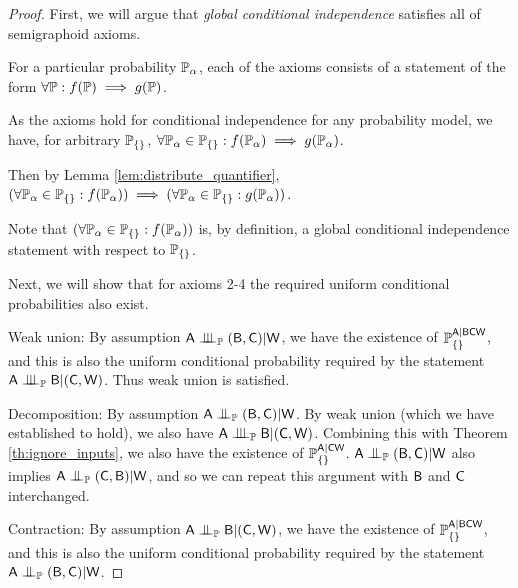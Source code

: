 \begin{proof}
First, we will argue that \emph{global conditional independence} satisfies all of semigraphoid axioms.

For a particular probability $\mathbb{P}_\alpha$, each of the axioms consists of a statement of the form $\forall \mathbb{P}: f(\mathbb{P})\implies g(\mathbb{P})$.

As the axioms hold for conditional independence for any probability model, we have, for arbitrary $\mathbb{P}_{\{\}}$, $\forall \mathbb{P}_\alpha\in \mathbb{P}_{\{\}}: f(\mathbb{P}_{\alpha}) \implies g(\mathbb{P}_\alpha)$. 

Then by Lemma \ref{lem:distribute_quantifier}, $(\forall \mathbb{P}_\alpha\in \mathbb{P}_{\{\}}: f(\mathbb{P}_{\alpha}))\implies (\forall \mathbb{P}_\alpha\in \mathbb{P}_{\{\}}: g(\mathbb{P}_{\alpha}))$.

Note that $(\forall \mathbb{P}_\alpha\in \mathbb{P}_{\{\}}: f(\mathbb{P}_{\alpha}))$ is, by definition, a global conditional independence statement with respect to $\mathbb{P}_{\{\}}$.

Next, we will show that for axioms 2-4 the required uniform conditional probabilities also exist. 

Weak union: By assumption $\RV{A}\CII_{\prob{P}} (\RV{B},\RV{C})|\RV{W}$, we have the existence of $\mathbb{P}_{\{\}}^{\mathsf{A}|\mathsf{BCW}}$, and this is also the uniform conditional probability required by the statement $\RV{A}\CII_{\prob{P}}\RV{B}|(\RV{C},\RV{W})$. Thus weak union is satisfied.

Decomposition: By assumption $\RV{A}\CI_{\prob{P}} (\RV{B},\RV{C})|\RV{W}$. By weak union (which we have established to hold), we also have $\RV{A}\CII_{\prob{P}}\RV{B}|(\RV{C},\RV{W})$. Combining this with Theorem \ref{th:ignore_inputs}, we also have the existence of $\mathbb{P}_{\{\}}^{\mathsf{A}|\mathsf{CW}}$. $\RV{A}\CI_{\prob{P}} (\RV{B},\RV{C})|\RV{W}$ also implies $\RV{A}\CI_{\prob{P}} (\RV{C},\RV{B})|\RV{W}$, and so we can repeat this argument with $\mathsf{B}$ and $\mathsf{C}$ interchanged.

Contraction: By assumption $\RV{A}\CI_{\prob{P}}\RV{B}|(\RV{C},\RV{W})$, we have the existence of $\mathbb{P}_{\{\}}^{\mathsf{A}|\mathsf{BCW}}$, and this is also the uniform conditional probability required by the statement $\RV{A}\CI_{\prob{P}}(\RV{B},\RV{C})|\RV{W}$.
\end{proof}

